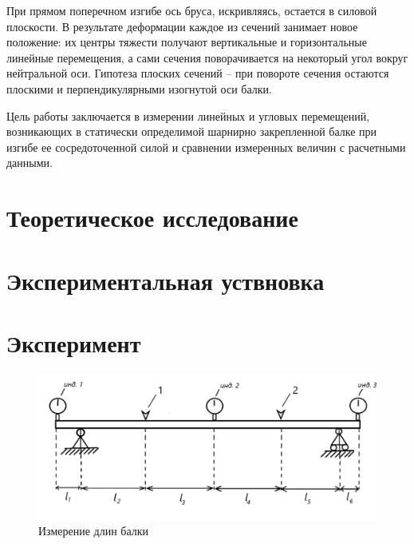 \documentclass[12pt, a4paper]{article}
\begin{document}
    При прямом поперечном изгибе ось бруса, искривляясь, остается в силовой плоскости. В результате деформации каждое из сечений занимает новое положение: их центры тяжести получают вертикальные и горизонтальные линейные перемещения, а сами сечения поворачивается на некоторый угол вокруг нейтральной оси.
    Гипотеза плоских сечений -- при повороте сечения остаются плоскими и перпендикулярными изогнутой оси балки.
    
    Цель работы заключается в измерении линейных и угловых перемещений, возникающих в статически определимой шарнирно закрепленной балке при изгибе ее сосредоточенной силой и сравнении измеренных величин с расчетными данными.
    
    \newpage
    \section{Теоретическое исследование}
    
    \newpage
    \section{Экспериментальная уствновка}
    
    \newpage
    \section{Эксперимент}
    
    \begin{figure}[h]
    	\centering
    	\includegraphics[width = 15cm]{pic_1.png}
    	\caption{Измерение длин балки}
    	\label{pic_wow}
    \end{figure}
    
\end{document}
